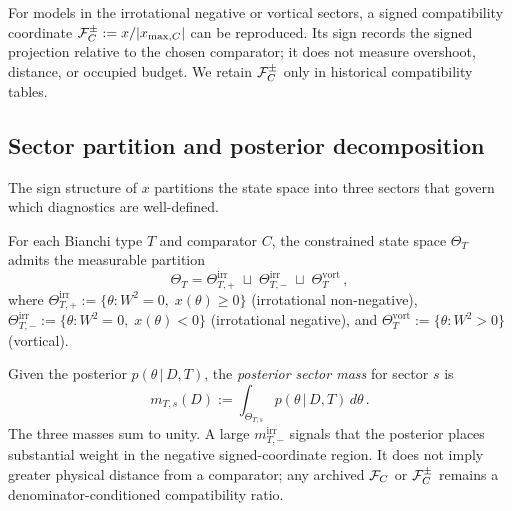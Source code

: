 \begin{remark}
\label{rem:signed-sat}
For models in the irrotational negative or vortical sectors,
a signed compatibility coordinate
$\mathcal{F}_C^{\pm}:=x/|x_{\max,C}|$ can be reproduced.  Its sign records the
signed projection relative to the chosen comparator; it does not
measure overshoot, distance, or occupied budget.  We retain
$\mathcal{F}_C^{\pm}$ only in historical compatibility tables.
\end{remark}


\subsection{Sector partition and posterior decomposition}
\label{sec:sector-partition}

The sign structure of $x$ partitions the state space into
three sectors that govern which diagnostics are well-defined.

\begin{definition}
\label{def:sector-partition}
For each Bianchi type $T$ and comparator $C$, the constrained
state space $\Theta_T$ admits the measurable partition
\begin{equation}\label{eq:sector-partition}
\Theta_T
= \Theta_{T,+}^{\mathrm{irr}}
  \;\sqcup\;
  \Theta_{T,-}^{\mathrm{irr}}
  \;\sqcup\;
  \Theta_T^{\mathrm{vort}}\,,
\end{equation}
where
$\Theta_{T,+}^{\mathrm{irr}} := \{\theta : W^2 = 0,\;
x(\theta) \geq 0\}$ (irrotational non-negative),
$\Theta_{T,-}^{\mathrm{irr}} := \{\theta : W^2 = 0,\;
x(\theta) < 0\}$ (irrotational negative),
and $\Theta_T^{\mathrm{vort}} := \{\theta : W^2 > 0\}$
(vortical).
\end{definition}

\begin{definition}
\label{def:sector-mass}
Given the posterior $p(\theta \,|\, D, T)$, the
\emph{posterior sector mass} for sector $s$ is
\begin{equation}\label{eq:sector-mass}
m_{T,s}(D)
:= \int_{\Theta_{T,s}} p(\theta \,|\, D, T)\,
   d\theta\,.
\end{equation}
The three masses sum to unity.  A large $m_{T,-}^{\mathrm{irr}}$
signals that the posterior places substantial weight in the
negative signed-coordinate region.  It does not imply greater
physical distance from a comparator; any archived $\mathcal{F}_C$ or
$\mathcal{F}_C^\pm$ remains a denominator-conditioned compatibility ratio.
\end{definition}

